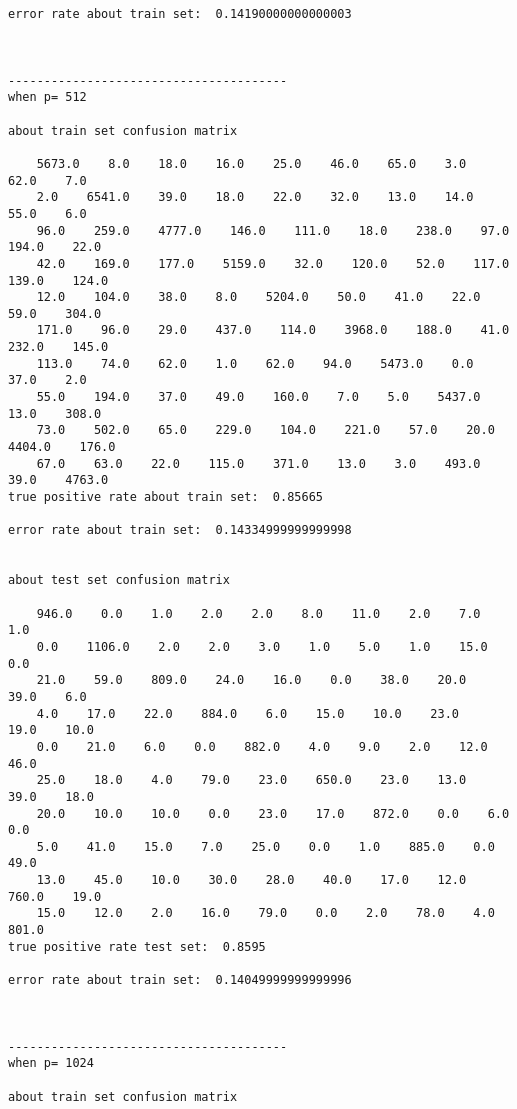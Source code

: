 \documentclass[11pt]{article}
\begin{document}
\begin{Verbatim}[commandchars=\\\{\}]
error rate about train set:  0.14190000000000003



---------------------------------------
when p= 512

about train set confusion matrix

    5673.0    8.0    18.0    16.0    25.0    46.0    65.0    3.0    62.0    7.0
    2.0    6541.0    39.0    18.0    22.0    32.0    13.0    14.0    55.0    6.0
    96.0    259.0    4777.0    146.0    111.0    18.0    238.0    97.0    194.0    22.0
    42.0    169.0    177.0    5159.0    32.0    120.0    52.0    117.0    139.0    124.0
    12.0    104.0    38.0    8.0    5204.0    50.0    41.0    22.0    59.0    304.0
    171.0    96.0    29.0    437.0    114.0    3968.0    188.0    41.0    232.0    145.0
    113.0    74.0    62.0    1.0    62.0    94.0    5473.0    0.0    37.0    2.0
    55.0    194.0    37.0    49.0    160.0    7.0    5.0    5437.0    13.0    308.0
    73.0    502.0    65.0    229.0    104.0    221.0    57.0    20.0    4404.0    176.0
    67.0    63.0    22.0    115.0    371.0    13.0    3.0    493.0    39.0    4763.0
true positive rate about train set:  0.85665

error rate about train set:  0.14334999999999998


about test set confusion matrix

    946.0    0.0    1.0    2.0    2.0    8.0    11.0    2.0    7.0    1.0
    0.0    1106.0    2.0    2.0    3.0    1.0    5.0    1.0    15.0    0.0
    21.0    59.0    809.0    24.0    16.0    0.0    38.0    20.0    39.0    6.0
    4.0    17.0    22.0    884.0    6.0    15.0    10.0    23.0    19.0    10.0
    0.0    21.0    6.0    0.0    882.0    4.0    9.0    2.0    12.0    46.0
    25.0    18.0    4.0    79.0    23.0    650.0    23.0    13.0    39.0    18.0
    20.0    10.0    10.0    0.0    23.0    17.0    872.0    0.0    6.0    0.0
    5.0    41.0    15.0    7.0    25.0    0.0    1.0    885.0    0.0    49.0
    13.0    45.0    10.0    30.0    28.0    40.0    17.0    12.0    760.0    19.0
    15.0    12.0    2.0    16.0    79.0    0.0    2.0    78.0    4.0    801.0
true positive rate test set:  0.8595

error rate about train set:  0.14049999999999996



---------------------------------------
when p= 1024

about train set confusion matrix


\end{Verbatim}
\end{document}
